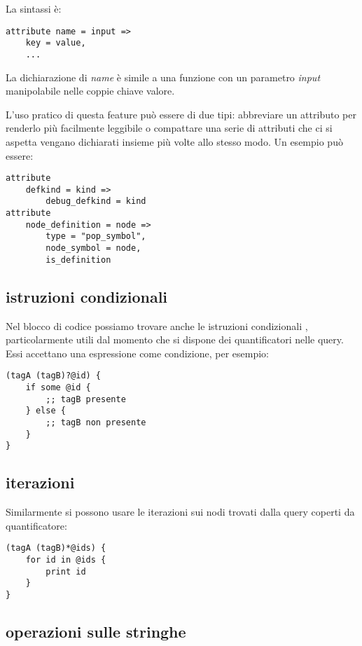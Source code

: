 La sintassi \`e:

\begin{lstlisting}
attribute name = input =>
    key = value,
    ...
\end{lstlisting}

La dichiarazione di \emph{name} \`e simile a una funzione con un parametro \emph{input} manipolabile nelle coppie chiave valore.

L'uso pratico di questa feature pu\`o essere di due tipi: abbreviare un attributo per renderlo pi\`u facilmente leggibile o compattare una serie di attributi che ci si aspetta vengano dichiarati insieme pi\`u volte allo stesso modo. Un esempio pu\`o essere:

\begin{lstlisting}
attribute
    defkind = kind =>
        debug_defkind = kind
attribute
    node_definition = node =>
        type = "pop_symbol",
        node_symbol = node,
        is_definition
\end{lstlisting}

\subsection{istruzioni condizionali}

Nel blocco di codice possiamo trovare anche le istruzioni condizionali \cite{TreeSitterGraphReferenceConditionals}, particolarmente utili dal momento che si dispone dei quantificatori nelle query.
Essi accettano una espressione come condizione, per esempio:

\begin{lstlisting}
(tagA (tagB)?@id) {
    if some @id {
        ;; tagB presente
    } else {
        ;; tagB non presente
    }
}
\end{lstlisting}

\subsection{iterazioni}

Similarmente si possono usare le iterazioni \cite{TreeSitterGraphReferenceListIterations} sui nodi trovati dalla query coperti da quantificatore:

\begin{lstlisting}
(tagA (tagB)*@ids) {
    for id in @ids {
        print id
    }
}
\end{lstlisting}

\subsection{operazioni sulle stringhe}

